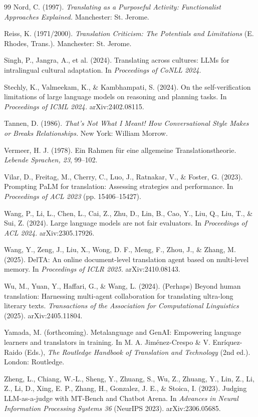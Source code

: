 \documentclass[11pt]{article}
\begin{document}
\begin{thebibliography}{99}
 Nord, C. (1997). \emph{Translating as a Purposeful Activity: Functionalist Approaches Explained.} Manchester: St. Jerome.

 Reiss, K. (1971/2000). \emph{Translation Criticism: The Potentials and Limitations} (E. Rhodes, Trans.). Manchester: St. Jerome.

 Singh, P., Jangra, A., et al. (2024). Translating across cultures: LLMs for intralingual cultural adaptation. In \emph{Proceedings of CoNLL 2024}.

 Stechly, K., Valmeekam, K., \& Kambhampati, S. (2024). On the self-verification limitations of large language models on reasoning and planning tasks. In \emph{Proceedings of ICML 2024.} arXiv:2402.08115.

 Tannen, D. (1986). \emph{That's Not What I Meant! How Conversational Style Makes or Breaks Relationships.} New York: William Morrow.

 Vermeer, H. J. (1978). Ein Rahmen für eine allgemeine Translationstheorie. \emph{Lebende Sprachen, 23}, 99--102.

 Vilar, D., Freitag, M., Cherry, C., Luo, J., Ratnakar, V., \& Foster, G. (2023). Prompting PaLM for translation: Assessing strategies and performance. In \emph{Proceedings of ACL 2023} (pp. 15406--15427).

 Wang, P., Li, L., Chen, L., Cai, Z., Zhu, D., Lin, B., Cao, Y., Liu, Q., Liu, T., \& Sui, Z. (2024). Large language models are not fair evaluators. In \emph{Proceedings of ACL 2024.} arXiv:2305.17926.

 Wang, Y., Zeng, J., Liu, X., Wong, D. F., Meng, F., Zhou, J., \& Zhang, M. (2025). DelTA: An online document-level translation agent based on multi-level memory. In \emph{Proceedings of ICLR 2025.} arXiv:2410.08143.

 Wu, M., Yuan, Y., Haffari, G., \& Wang, L. (2024). (Perhaps) Beyond human translation: Harnessing multi-agent collaboration for translating ultra-long literary texts. \emph{Transactions of the Association for Computational Linguistics} (2025). arXiv:2405.11804.

 Yamada, M. (forthcoming). Metalanguage and GenAI: Empowering language learners and translators in training. In M. A. Jiménez-Crespo \& V. Enríquez-Raido (Eds.), \emph{The Routledge Handbook of Translation and Technology} (2nd ed.). London: Routledge.

 Zheng, L., Chiang, W.-L., Sheng, Y., Zhuang, S., Wu, Z., Zhuang, Y., Lin, Z., Li, Z., Li, D., Xing, E. P., Zhang, H., Gonzalez, J. E., \& Stoica, I. (2023). Judging LLM-as-a-judge with MT-Bench and Chatbot Arena. In \emph{Advances in Neural Information Processing Systems 36} (NeurIPS 2023). arXiv:2306.05685.

\end{thebibliography}
\end{document}
